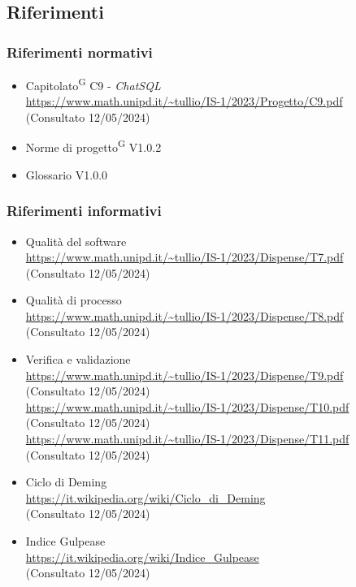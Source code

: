 \documentclass[5pt]{article}
\begin{document}
	\subsection{Riferimenti}
	\subsubsection{Riferimenti normativi}
	\begin{itemize}
		\item Capitolato\textsuperscript{G} C9 - \textit{ChatSQL} \\ \url{https://www.math.unipd.it/~tullio/IS-1/2023/Progetto/C9.pdf} \\ (Consultato 12/05/2024)
		\item Norme di progetto\textsuperscript{G} V1.0.2
		\item Glossario V1.0.0
	\end{itemize}
	\subsubsection{Riferimenti informativi}
	\begin{itemize}
		\item Qualità del software \\ \url{https://www.math.unipd.it/~tullio/IS-1/2023/Dispense/T7.pdf} \\ (Consultato 12/05/2024)
		\item Qualità di processo \\ \url{https://www.math.unipd.it/~tullio/IS-1/2023/Dispense/T8.pdf} \\ (Consultato 12/05/2024)
		\item Verifica e validazione \\
		\url{https://www.math.unipd.it/~tullio/IS-1/2023/Dispense/T9.pdf} \\ (Consultato 12/05/2024) \\
		\url{https://www.math.unipd.it/~tullio/IS-1/2023/Dispense/T10.pdf} \\ (Consultato 12/05/2024) \\
		\url{https://www.math.unipd.it/~tullio/IS-1/2023/Dispense/T11.pdf} \\ (Consultato 12/05/2024)
		\item Ciclo di Deming \\
		\url{https://it.wikipedia.org/wiki/Ciclo_di_Deming} \\ (Consultato 12/05/2024)
		\item Indice Gulpease \\
		\url{https://it.wikipedia.org/wiki/Indice_Gulpease} \\ (Consultato 12/05/2024)
	\end{itemize}
	
\end{document}
